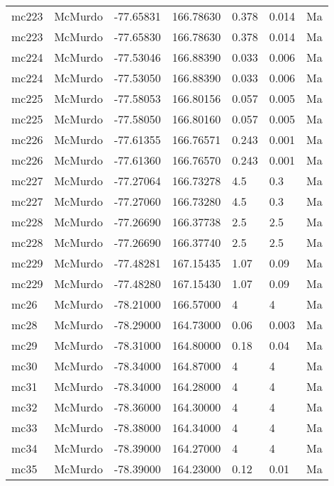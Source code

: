 \documentclass{article}
\begin{document}
\begin{longtable}{llrrlll}
 mc223 &  McMurdo & -77.65831 &  166.78630 &   0.378 &     0.014 &    Ma \\
 mc223 &  McMurdo & -77.65830 &  166.78630 &   0.378 &     0.014 &    Ma \\
 mc224 &  McMurdo & -77.53046 &  166.88390 &   0.033 &     0.006 &    Ma \\
 mc224 &  McMurdo & -77.53050 &  166.88390 &   0.033 &     0.006 &    Ma \\
 mc225 &  McMurdo & -77.58053 &  166.80156 &   0.057 &     0.005 &    Ma \\
 mc225 &  McMurdo & -77.58050 &  166.80160 &   0.057 &     0.005 &    Ma \\
 mc226 &  McMurdo & -77.61355 &  166.76571 &   0.243 &     0.001 &    Ma \\
 mc226 &  McMurdo & -77.61360 &  166.76570 &   0.243 &     0.001 &    Ma \\
 mc227 &  McMurdo & -77.27064 &  166.73278 &     4.5 &       0.3 &    Ma \\
 mc227 &  McMurdo & -77.27060 &  166.73280 &     4.5 &       0.3 &    Ma \\
 mc228 &  McMurdo & -77.26690 &  166.37738 &     2.5 &       2.5 &    Ma \\
 mc228 &  McMurdo & -77.26690 &  166.37740 &     2.5 &       2.5 &    Ma \\
 mc229 &  McMurdo & -77.48281 &  167.15435 &    1.07 &      0.09 &    Ma \\
 mc229 &  McMurdo & -77.48280 &  167.15430 &    1.07 &      0.09 &    Ma \\
  mc26 &  McMurdo & -78.21000 &  166.57000 &       4 &         4 &    Ma \\
  mc28 &  McMurdo & -78.29000 &  164.73000 &    0.06 &     0.003 &    Ma \\
  mc29 &  McMurdo & -78.31000 &  164.80000 &    0.18 &      0.04 &    Ma \\
  mc30 &  McMurdo & -78.34000 &  164.87000 &       4 &         4 &    Ma \\
  mc31 &  McMurdo & -78.34000 &  164.28000 &       4 &         4 &    Ma \\
  mc32 &  McMurdo & -78.36000 &  164.30000 &       4 &         4 &    Ma \\
  mc33 &  McMurdo & -78.38000 &  164.34000 &       4 &         4 &    Ma \\
  mc34 &  McMurdo & -78.39000 &  164.27000 &       4 &         4 &    Ma \\
  mc35 &  McMurdo & -78.39000 &  164.23000 &    0.12 &      0.01 &    Ma \\

\end{longtable}
\end{document}
